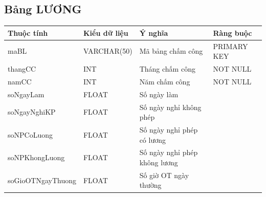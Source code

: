 \documentclass[a4paper,12pt]{report}
\begin{document}
\subsection{Bảng LƯƠNG}
\noindent
\begin{center}
    \begin{longtable}{|>{\centering\arraybackslash}p{4.5cm}|
        >{\centering\arraybackslash}p{3.5cm}|
        >{\centering\arraybackslash}p{3.5cm}|
        >{\centering\arraybackslash}p{4cm}|}
        \hline
        \textbf{Thuộc tính}                                                                                                               &
        \textbf{Kiểu dữ liệu}                                                                                                                             &
        \textbf{Ý nghĩa}                                                                                                 &
        \textbf{Ràng buộc}                                                                                                         \\
        \hline
        maBL &  VARCHAR(50)  & Mã bảng chấm công & PRIMARY KEY \\
        \hline
        thangCC &  INT  & Tháng chấm công & NOT NULL \\                                                                                                                          
        \hline
        namCC &  INT  & Năm chấm công & NOT NULL \\                                                                                                                          
        \hline
        soNgayLam &  FLOAT  & Số ngày làm & \\                                                                                                                          
        \hline
        soNgayNghiKP &  FLOAT  & Số ngày nghỉ không phép & \\                                                                                                                          
        \hline
        soNPCoLuong &  FLOAT  & Số ngày nghỉ phép có lương & \\                                                                                                                          
        \hline
        soNPKhongLuong &  FLOAT  & Số ngày nghỉ phép không lương & \\
        \hline
        soGioOTNgayThuong &  FLOAT  & Số giờ OT ngày thường & \\                                                                                                                          

\end{longtable}
\end{center}
\end{document}
